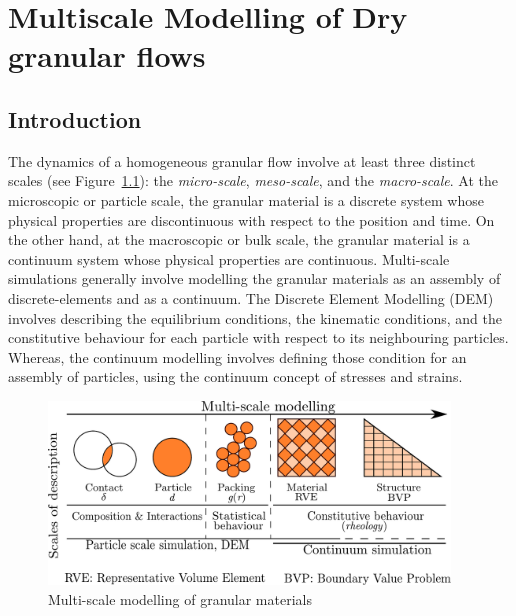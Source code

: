 \chapter{Multiscale Modelling of Dry granular flows}

\ifpdf
    \graphicspath{{Chapter4/figs/raster/}{Chapter4/figs/pdf/}{Chapter4/figs/}}
\else
    \graphicspath{{Chapter4/figs/vector/}{Chapter4/figs/}}
\fi

\section{Introduction}

The dynamics of a homogeneous granular flow involve at least three distinct 
scales (see Figure~\ref{fig:multiscale}): the \textit{micro-scale}, 
\textit{meso-scale}, and the \textit{macro-scale}. At the microscopic or 
particle scale, the granular material is a discrete system whose physical 
properties are discontinuous with respect to the position and time. On the 
other hand, at the macroscopic or bulk scale, the granular material is a 
continuum system whose physical properties are continuous. Multi-scale 
simulations generally involve modelling the granular materials as an assembly 
of discrete-elements and as a continuum. The Discrete Element Modelling (DEM) 
involves describing the equilibrium conditions, the kinematic conditions, and 
the constitutive behaviour for each particle with respect to its neighbouring 
particles. Whereas, the continuum modelling involves defining those condition 
for an assembly of particles, using the continuum concept of stresses and 
strains.

\begin{figure}[htbp]
\centering
\includegraphics[width=0.95\textwidth]{multiscale}
\caption{Multi-scale modelling of granular materials}
\label{fig:multiscale}
\end{figure}

